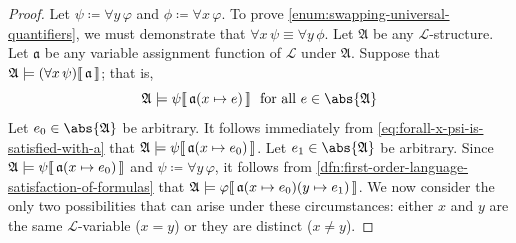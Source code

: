 \begin{proof}
    Let \( \psi \coloneq \forall y \, \varphi \) and \( \phi \coloneq \forall x \, \varphi \).
    To prove \ref{enum:swapping-universal-quantifiers}, we must demonstrate that \( \forall x \, \psi \equiv \forall y \, \phi \).
    Let \( \mathfrak{A} \) be any \( \mathcal{L} \)-structure. Let \( \mathfrak{a} \) be any variable assignment function of \( \mathcal{L} \)
    under \( \mathfrak{A} \).
    Suppose that \( \folwffsatisfaction{\mathfrak{A}}{\mleft( \forall x \, \psi \mright)}{\mathfrak{a}} \); that is,
    \begin{equation}
        \label{eq:forall-x-psi-is-satisfied-with-a}
        \folwffsatisfaction{\mathfrak{A}}{\psi}{ \folmodifiedvariableassignmentfunction{\mathfrak{a}}{x}{e} }
        \ \ \text{for all} \ e \in \abs{\mathfrak{A}}
    \end{equation}
    Let \( e_{0} \in \abs{\mathfrak{A}} \) be arbitrary. It follows immediately from \eqref{eq:forall-x-psi-is-satisfied-with-a} that
    \( \folwffsatisfaction{\mathfrak{A}}{\psi}{ \folmodifiedvariableassignmentfunction{\mathfrak{a}}{x}{e_{0}} } \).
    Let \( e_{1} \in \abs{\mathfrak{A}} \) be arbitrary. Since
    \( \folwffsatisfaction{\mathfrak{A}}{\psi}{ \folmodifiedvariableassignmentfunction{\mathfrak{a}}{x}{e_{0}} } \)
    and \( \psi \coloneq \forall y \, \varphi \),
    it follows from \cref{dfn:first-order-language-satisfaction-of-formulas} that
    \( \folwffsatisfaction{\mathfrak{A}}{\varphi}{ \folmodifiedvariableassignmentfunction{ \folmodifiedvariableassignmentfunction{\mathfrak{a}}{x}{e_{0}} }{y}{e_{1}} } \).
    We now consider the only two possibilities that can arise under these circumstances: either \( x \) and \( y \) are the same \( \mathcal{L} \)-variable (\( x = y \))
    or they are distinct (\( x \neq y \)).


\end{proof}

